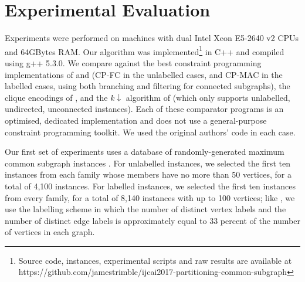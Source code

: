 \section{Experimental Evaluation}\label{sec:mcsplit-experiments}

Experiments were performed on machines with dual Intel Xeon E5-2640 v2 CPUs and
64GBytes RAM. Our algorithm was
implemented\footnote{Source code, instances, experimental scripts and raw
results are available at
https://github.com/jamestrimble/ijcai2017-partitioning-common-subgraph}
in C++ and compiled using g++ 5.3.0. We compare against the best constraint
programming implementations of \citet{DBLP:conf/cp/NdiayeS11} and
\citet{DBLP:conf/cp/McCreeshNPS16} (CP-FC in the unlabelled cases, and CP-MAC
in the labelled cases, using both branching and filtering for connected
subgraphs), the clique encodings of \citet{DBLP:conf/cp/McCreeshNPS16}, and the
$k{\downarrow}$ algorithm of \citet{UpcomingAAAIPaper} (which only supports
unlabelled, undirected, unconnected instances).  Each of these comparator
programs is an optimised, dedicated implementation and does not use a
general-purpose constraint programming toolkit.  We used the original authors'
code in each case.

Our first set of experiments uses a database of randomly-generated maximum
common subgraph instances
\citep{DBLP:journals/prl/SantoFSV03,DBLP:journals/jgaa/ConteFV07}.  For
unlabelled instances, we selected the first ten instances from each family
whose members have no more than 50 vertices, for a total of 4,100 instances.
For labelled instances, we selected the first ten instances from every family,
for a total of 8,140 instances with up to 100 vertices; like
\citet{DBLP:conf/cp/McCreeshNPS16}, we use the labelling scheme in which the
number of distinct vertex labels and the number of distinct edge labels is
approximately equal to 33 percent of the number of vertices in each graph.

